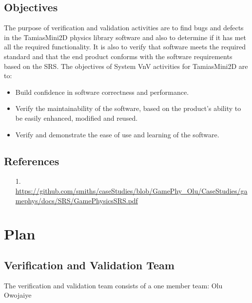 \documentclass[12pt, titlepage]{article}
\begin{document}
\subsection{Objectives}

The purpose of verification and validation activities are to find bugs and defects in the TamiasMini2D physics library software and also to determine if it has met all the required functionality. It is also to verify that software meets the required standard and that the end product conforms with the software requirements based on the SRS. The objectives of System VnV activities for TamiasMini2D are to:
  \begin{itemize}
	\item Build confidence in software correctness and performance.
	\item Verify the maintainability of the software, based on the product's ability to be easily enhanced, modified
	  and reused.
	\item Verify and demonstrate the ease of use and learning of the software.
  \end{itemize}
	


\subsection{References}

\begin{itemize}
	\item[1.] \url {https://github.com/smiths/caseStudies/blob/GamePhy_Olu/CaseStudies/gamephys/docs/SRS/GamePhysicsSRS.pdf}
\end{itemize}


\section{Plan}
	
\subsection{Verification and Validation Team}
The verification and validation team consists of a one member team: Olu Owojaiye
\end{document}
